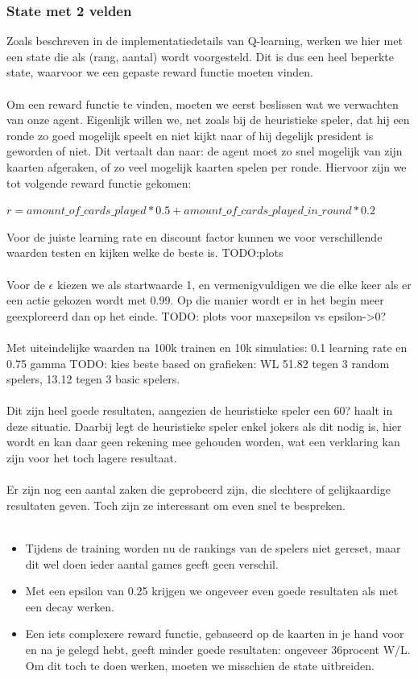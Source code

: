 \documentclass[11pt]{article}
\begin{document}
\subsubsection{State met 2 velden}
Zoals beschreven in de implementatiedetails van Q-learning, werken we hier met een state die als (rang, aantal) wordt voorgesteld. Dit is dus een heel beperkte state, waarvoor we een gepaste reward functie moeten vinden.\\\\
Om een reward functie te vinden, moeten we eerst beslissen wat we verwachten van onze agent. Eigenlijk willen we, net zoals bij de heuristieke speler, dat hij een ronde zo goed mogelijk speelt en niet kijkt naar of hij degelijk president is geworden of niet. Dit vertaalt dan naar: de agent moet zo snel mogelijk van zijn kaarten afgeraken, of zo veel mogelijk kaarten spelen per ronde. Hiervoor zijn we tot volgende reward functie gekomen:
\begin{center}
$r = amount\_of\_cards\_played * 0.5 + amount\_of\_cards\_played\_in\_round * 0.2$
\end{center}
Voor de juiste learning rate en discount factor kunnen we voor verschillende waarden testen en kijken welke de beste is. TODO:plots\\\\
Voor de $\epsilon$ kiezen we als startwaarde 1, en vermenigvuldigen we die elke keer als er een actie gekozen wordt met 0.99. Op die manier wordt er in het begin meer geexploreerd dan op het einde. TODO: plots voor maxepsilon vs epsilon->0?\\\\
Met uiteindelijke waarden na 100k trainen en 10k simulaties: 0.1 learning rate en 0.75 gamma TODO: kies beste based on grafieken: WL 51.82 tegen 3 random spelers, 13.12 tegen 3 basic spelers. \\\\
Dit zijn heel goede resultaten, aangezien de heuristieke speler een 60? haalt in deze situatie. Daarbij legt de heuristieke speler enkel jokers als dit nodig is, hier wordt en kan daar geen rekening mee gehouden worden, wat een verklaring kan zijn voor het toch lagere resultaat.\\\\
Er zijn nog een aantal zaken die geprobeerd zijn, die slechtere of gelijkaardige resultaten geven. Toch zijn ze interessant om even snel te bespreken.\\\\


\begin{itemize}
	\item Tijdens de training worden nu de rankings van de spelers niet gereset, maar dit wel doen ieder aantal games geeft geen verschil.
	\item Met een epsilon van 0.25 krijgen we ongeveer even goede resultaten als met een decay werken.
	\item Een iets complexere reward functie, gebaseerd op de kaarten in je hand voor en na je gelegd hebt, geeft minder goede resultaten: ongeveer 36procent W/L. Om dit toch te doen werken, moeten we misschien de state uitbreiden.
\end{itemize}
\end{document}
